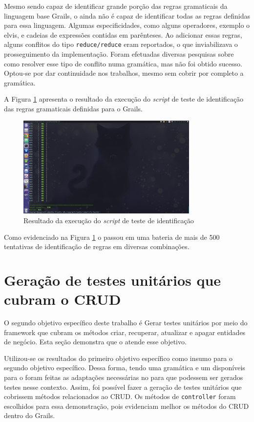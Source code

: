 Mesmo sendo capaz de identificar grande porção das regras gramaticais da
linguagem base \textsf{Grails}, o \parser ainda não é capaz de identificar todas
as regras definidas para essa linguagem. Algumas especificidades, como alguns
operadores, exemplo o \textsf{elvis}, e cadeias de expressões contidas
em parênteses. Ao adicionar essas regras, alguns conflitos do tipo
\lstinline|reduce/reduce| eram reportados, o que inviabilizava o
prosseguimento da implementação. Foram efetuadas diversas pesquisas
sobre como resolver esse tipo de conflito numa gramática, mas não foi
obtido sucesso. Optou-se por dar continuidade nos trabalhos, mesmo sem
cobrir por completo a gramática.

A Figura \ref{identification-test} apresenta o resultado da execução do
\textit{script} de teste de identificação das regras gramaticais definidas
para o \textsf{Grails}.
\begin{figure}[h]
  \centering
    \includegraphics[width=0.8\textwidth]{figuras/identification-test.png}
    \caption{Resultado da execução do \textit{script} de teste de identificação}
    \label{identification-test}
\end{figure}
\FloatBarrier

Como evidenciado na Figura \ref{identification-test} o \parser passou em uma
bateria de mais de 500 tentativas de identificação de regras em diversas
combinações.

\section{Geração de testes unitários que cubram o CRUD}
O segundo objetivo específico deste trabalho é \textsf{Gerar testes unitários por meio
do framework que cubram os métodos criar, recuperar, atualizar e apagar
entidades de negócio}. Esta seção demonstra que o \scarefault atende
esse objetivo.

Utilizou-se os resultados do primeiro objetivo específico como insumo
para o segundo objetivo específico. Dessa forma, tendo uma gramática e
um \parser disponíveis para o \grails foram feitas as adaptações necessárias
no \framework para que podessem ser gerados testes nesse contexto.
Assim, foi possível fazer a geração de testes unitários que cobrissem
métodos relacionados ao CRUD. Os métodos de \lstinline|controller| foram
escolhidos para essa demonstração, pois evidenciam melhor os métodos
do CRUD dentro do \textsf{Grails}.


